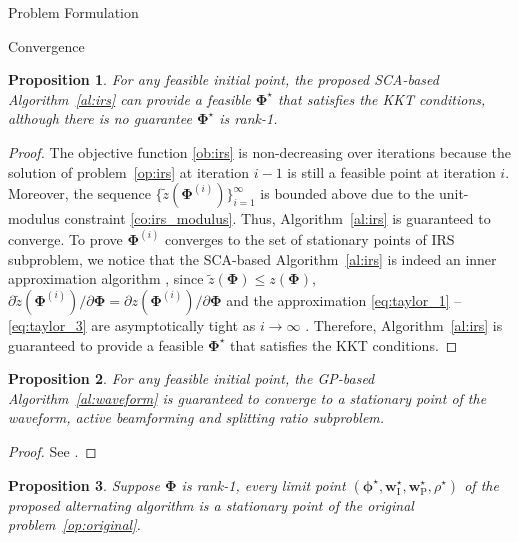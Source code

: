 \documentclass[journal]{IEEEtran}
\newtheorem{proposition}{Proposition}
\begin{document}
\begin{section}{Problem Formulation}
		\begin{subsection}{Convergence}
			\begin{proposition}\label{pr:irs}
				For any feasible initial point, the proposed SCA-based Algorithm~\ref{al:irs} can provide a feasible $\boldsymbol{\Phi}^{\star}$ that satisfies the KKT conditions, although there is no guarantee $\boldsymbol{\Phi}^{\star}$ is rank-\num{1}.
			\end{proposition}

			\begin{proof}\label{pf:irs}
				The objective function \eqref{ob:irs} is non-decreasing over iterations because the solution of problem~\eqref{op:irs} at iteration $i-1$ is still a feasible point at iteration $i$. Moreover, the sequence $\{\tilde{z}(\boldsymbol{\Phi}^{(i)})\}_{i=1}^{\infty}$ is bounded above due to the unit-modulus constraint \eqref{co:irs_modulus}. Thus, Algorithm~\ref{al:irs} is guaranteed to converge. To prove $\boldsymbol{\Phi}^{(i)}$ converges to the set of stationary points of IRS subproblem, we notice that the SCA-based Algorithm~\ref{al:irs} is indeed an inner approximation algorithm \cite{Marks1978}, since $\tilde{z}(\boldsymbol{\Phi}) \le z(\boldsymbol{\Phi})$, $\partial\tilde{z}(\boldsymbol{\Phi}^{(i)})/\partial\boldsymbol{\Phi}=\partial z(\boldsymbol{\Phi}^{(i)})/\partial\boldsymbol{\Phi}$ and the approximation \eqref{eq:taylor_1} -- \eqref{eq:taylor_3} are asymptotically tight as $i \to \infty$ \cite{Li2013}. Therefore, Algorithm~\ref{al:irs} is guaranteed to provide a feasible $\boldsymbol{\Phi}^{\star}$ that satisfies the KKT conditions.
			\end{proof}

			\begin{proposition}\label{pr:waveform}
				For any feasible initial point, the GP-based Algorithm~\ref{al:waveform} is guaranteed to converge to a stationary point of the waveform, active beamforming and splitting ratio subproblem.
			\end{proposition}

			\begin{proof}\label{pf:waveform}
				See \cite{Clerckx2016a,Clerckx2018b}.
			\end{proof}

			\begin{proposition}\label{pr:ao}
				Suppose $\boldsymbol{\Phi}$ is rank-\num{1}, every limit point $(\boldsymbol{\phi}^{\star},\boldsymbol{w}_{\mathrm{I}}^{\star},\boldsymbol{w}_{\mathrm{P}}^{\star},\rho^{\star})$ of the proposed alternating algorithm is a stationary point of the original problem~\eqref{op:original}.
			\end{proposition}


\end{subsection}
\end{section}
\end{document}
